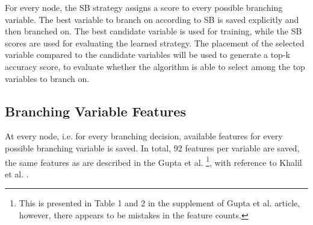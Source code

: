 For every node, the \gls{SB} strategy assigns a score to every possible branching variable. The best variable to branch on according to \gls{SB} is saved explicitly and then branched on. The best candidate variable is used for training, while the \gls{SB} scores are used for evaluating the learned strategy. The placement of the selected variable compared to the candidate variables will be used to generate a top-k accuracy score, to evaluate whether the algorithm is able to select among the top variables to branch on.  


\subsection{Branching Variable Features}

At every node, i.e. for every branching decision, available features for every possible branching variable is saved. 
In total, 92 features per variable are saved, the same features as are described in the Gupta et al. \cite{gupta2020hybrid}\footnote{This is presented in Table 1 and 2 in the supplement of Gupta et al. \cite{gupta2020hybrid} article, however, there appears to be mistakes in the feature counts.}, with reference to Khalil et al. \cite{khalil2016learning}.


